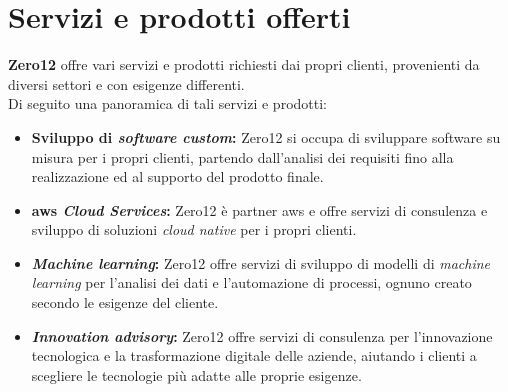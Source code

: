 \section{Servizi e prodotti offerti}
\label{sez:servizi-prodotti-offerti}

\textbf{Zero12} offre vari servizi e prodotti richiesti dai propri clienti, provenienti da diversi settori e con esigenze differenti.\\
Di seguito una panoramica di tali servizi e prodotti:

\begin{itemize}
    \item \textbf{Sviluppo di \textit{software custom}:} Zero12 si occupa di sviluppare software su misura per i propri clienti, partendo dall'analisi dei requisiti fino alla realizzazione ed al supporto del prodotto finale.\\
    \item \textbf{\gls{aws} \textit{Cloud Services}:} Zero12 è partner \gls{aws} e offre servizi di consulenza e sviluppo di soluzioni \textit{cloud native} per i propri clienti.\\
    \item \textbf{\textit{Machine learning}:} Zero12 offre servizi di sviluppo di modelli di \textit{machine learning} per l'analisi dei dati e l'automazione di processi, ognuno creato secondo le esigenze del cliente.\\
    \item \textbf{\textit{Innovation advisory}:} Zero12 offre servizi di consulenza per l'innovazione tecnologica e la trasformazione digitale delle aziende, aiutando i clienti a scegliere le tecnologie più adatte alle proprie esigenze.\\
\end{itemize}